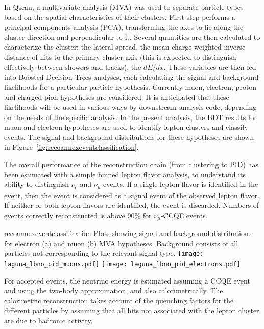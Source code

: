 In Qscan, a multivariate analysis (MVA) was used to separate particle types based on the spatial characteristics of their clusters.
First step performs a principal components analysis (PCA), transforming the axes to lie along the 
cluster direction and perpendicular to it. Several quantities are then calculated to 
characterize the cluster: the lateral spread, the mean charge-weighted inverse distance of hits to the primary cluster axis
(this is expected to distinguish effectively between showers and tracks), the $dE/dx$.
These variables are then fed into Boosted Decision Trees analyses, 
each calculating the signal and background likelihoods for a particular particle hypothesis.
Currently muon, electron, proton and charged pion hypotheses are considered. It is anticipated that these likelihoods will be used in various ways by downstream analysis code, depending on the needs of the specific analysis.
In the present analysis, the BDT results for muon and electron hypotheses are used to identify lepton clusters and classify events. The signal and background distributions for these hypotheses are shown in 
Figure~\ref{fig:recoannexeventclassification}.

The overall performance of the reconstruction chain (from clustering to PID) has been estimated with a simple binned lepton flavor analysis, 
to understand its ability to distinguish $\nu_{e}$ and $\nu_{\mu}$ events.
If a single lepton flavor is identified in the event, then the event is considered as a signal event of the observed lepton flavor. 
If neither or both lepton flavors are identified, the event is discarded.
Numbers of events correctly reconstructed is above 90$\%$ for $\nu_{\mu}$-CCQE events.



\begin{cdrfigure}{recoannexeventclassification}
{Plots showing signal and background distributions for electron (a) and muon (b) MVA hypotheses. 
Background consists of all particles not corresponding to the relevant signal type.}
\texttt{[image: laguna\_lbno\_pid\_muons.pdf]}
\texttt{[image: laguna\_lbno\_pid\_electrons.pdf]}
\end{cdrfigure}


For accepted events, the neutrino energy is estimated  assuming a CCQE event and using the two-body approximation, and also calorimetrically.
The calorimetric reconstruction takes account of the quenching factors for the different particles by 
assuming that all hits not associated with the lepton cluster are due to hadronic activity.

